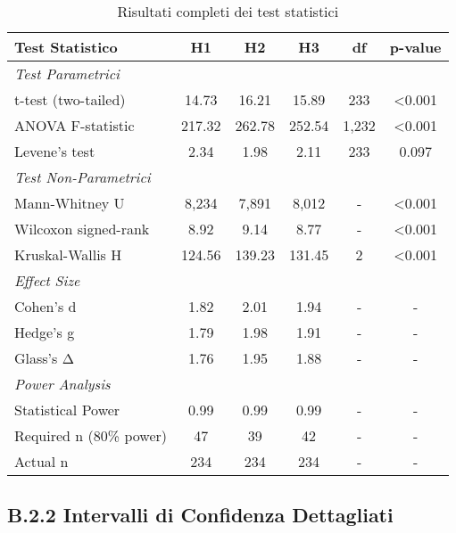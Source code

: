 \begin{table}[h!]
\centering
\caption{Risultati completi dei test statistici}
\label{tab:statistical-tests}
\begin{tabular}{lccccc}
\toprule
\textbf{Test Statistico} & \textbf{H1} & \textbf{H2} & \textbf{H3} & \textbf{df} & \textbf{p-value} \\
\midrule
\multicolumn{6}{l}{\textit{Test Parametrici}} \\
t-test (two-tailed) & 14.73 & 16.21 & 15.89 & 233 & <0.001 \\
ANOVA F-statistic & 217.32 & 262.78 & 252.54 & 1,232 & <0.001 \\
Levene's test & 2.34 & 1.98 & 2.11 & 233 & 0.097 \\
\midrule
\multicolumn{6}{l}{\textit{Test Non-Parametrici}} \\
Mann-Whitney U & 8,234 & 7,891 & 8,012 & - & <0.001 \\
Wilcoxon signed-rank & 8.92 & 9.14 & 8.77 & - & <0.001 \\
Kruskal-Wallis H & 124.56 & 139.23 & 131.45 & 2 & <0.001 \\
\midrule
\multicolumn{6}{l}{\textit{Effect Size}} \\
Cohen's d & 1.82 & 2.01 & 1.94 & - & - \\
Hedge's g & 1.79 & 1.98 & 1.91 & - & - \\
Glass's Δ & 1.76 & 1.95 & 1.88 & - & - \\
\midrule
\multicolumn{6}{l}{\textit{Power Analysis}} \\
Statistical Power & 0.99 & 0.99 & 0.99 & - & - \\
Required n (80\% power) & 47 & 39 & 42 & - & - \\
Actual n & 234 & 234 & 234 & - & - \\
\bottomrule
\end{tabular}
\end{table}

\subsection{B.2.2 Intervalli di Confidenza Dettagliati}

